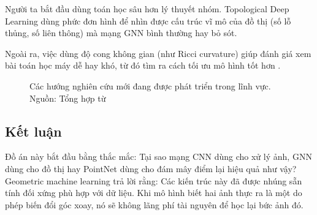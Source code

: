 Người ta bắt đầu dùng toán học sâu hơn lý thuyết nhóm. Topological Deep Learning \cite{eitan2024topological} dùng phức đơn hình để nhìn được cấu trúc vĩ mô của đồ thị (số lỗ thủng, số liên thông) mà mạng GNN bình thường hay bỏ sót. 

Ngoài ra, việc dùng độ cong không gian (như Ricci curvature) giúp đánh giá xem bài toán học máy dễ hay khó, từ đó tìm ra cách tối ưu mô hình tốt hơn \cite{jegelka2025tutorial}.

\begin{figure}[H]
    \centering
    \caption[Sáu hướng nghiên cứu mở trong Geometric Machine Learning]{Các hướng nghiên cứu mới đang được phát triển trong lĩnh vực. Nguồn: Tổng hợp từ \cite{jegelka2025tutorial}}
    \label{fig:open-directions}
\end{figure}

\subsection{Kết luận}
\label{subsec:ket-luan}

Đồ án này bắt đầu bằng thắc mắc: Tại sao mạng CNN dùng cho xử lý ảnh, GNN dùng cho đồ thị hay PointNet dùng cho đám mây điểm lại hiệu quả như vậy? Geometric machine learning trả lời rằng: Các kiến trúc này đã được nhúng sẵn tính đối xứng phù hợp với dữ liệu. Khi mô hình biết hai ảnh thực ra là một do phép biến đổi góc xoay, nó sẽ không lãng phí tài nguyên để học lại bức ảnh đó.

